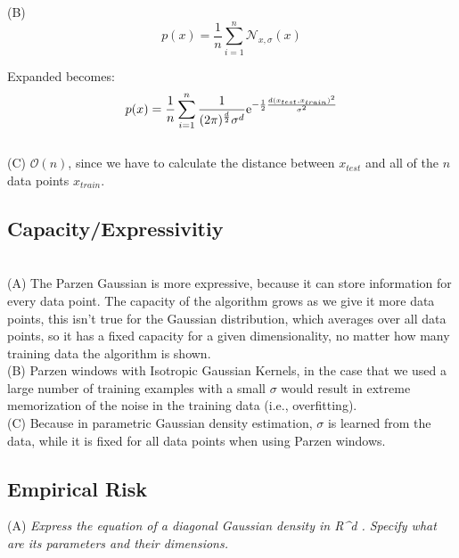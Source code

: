 \documentclass{amsart}
\theoremstyle{definition}
\theoremstyle{remark}
\numberwithin{equation}{section}
\begin{document}
(B) \\

\begin{equation}
    p(x) = \frac{1}{n}\sum_{i=1}^{n}\mathcal{N}_{x, \sigma}(x)
\end{equation}

Expanded becomes: \\

\begin{equation}
    p(x) = \frac{1}{n}\sum_{i=1}^{n} \frac{1}{(2\pi)^{\frac{d}{2}} \sigma^d} {\rm e}^{-\frac{1}{2}\frac{d(x_{test}, x_{train})^2}{\sigma^2} }
\end{equation}\\

(C) $\mathcal{O}(n)$, since we have to calculate the distance between 
$x_{test}$ and all of the $n$ data points $x_{train}$. \\

\subsection{Capacity/Expressivitiy} \\

(A) The Parzen Gaussian is more expressive, because it can store information for
 every data point. The capacity of the algorithm grows as we give it more data 
 points, this isn't true for the Gaussian distribution, which averages over all 
 data points, so it has a fixed capacity for a given dimensionality, no matter 
 how many training data the algorithm is shown. \\

(B) Parzen windows with Isotropic Gaussian Kernels, in the case that we used a 
large number of training examples with a small $\sigma$ would result in extreme 
memorization of the noise in the training data (i.e., overfitting). \\

(C) Because in parametric Gaussian density estimation, $\sigma$ is learned from 
the data, while it is fixed for all data points when using Parzen windows. \\ 

\subsection{Empirical Risk}

(A) \textit{Express the equation of a diagonal Gaussian density in R^d . Specify 
            what are its parameters and their dimensions.} \\
\end{document}
